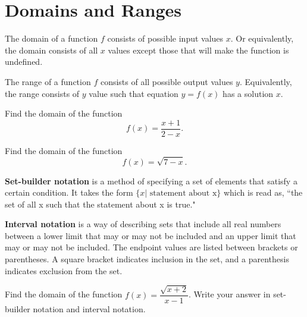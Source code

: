 \newpage
\thispagestyle{fancy}

\section{Domains and Ranges}
\begin{howto}
The domain of a function $f$ consists of possible input values $x$. Or equivalently, the domain consists of all $x$ values except those that will make the function is undefined.

The range of a function $f$ consists of all possible output values $y$. Equivalently, the range consists of $y$ value such that equation $y=f(x)$ has a solution $x$. 
\end{howto}

\begin{example}
  Find the domain of the function $$f(x)=\dfrac{x+1}{2-x}.$$
\end{example}

\begin{example}
  Find the domain of the function
$$
f(x)=\sqrt{7-x}.
$$
\end{example}

\begin{definition}
  \textbf{Set-builder notation} is a method of specifying a set of elements that satisfy a certain condition. It takes the form $\{x|\text{ statement about x}\}$ which is read as, ``the set of all x such that the statement about x is true."
  
  \textbf{Interval notation} is a way of describing sets that include all real numbers between a lower limit that may or may not be included and an upper limit that may or may not be included. The endpoint values are listed between brackets or parentheses. A square bracket indicates inclusion in the set, and a parenthesis indicates exclusion from the set.
\end{definition}

\newpage

\begin{example}
  Find the domain of the function $f(x)=\dfrac{\sqrt{x+2}}{x-1}$. Write your answer in set-builder notation and interval notation.
\end{example}



